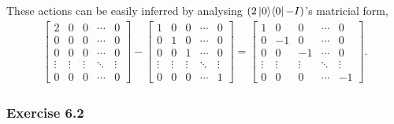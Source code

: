 These actions can be easily inferred by analysing $(2 \mathop{\mathinner{ |{0}\rangle \langle{0}|}} - I)$'s matricial form,
\begin{align}
    \left[ \begin{matrix}
        2 & 0 & 0 & \cdots & 0 \\
        0 & 0 & 0 & \cdots & 0 \\
        0 & 0 & 0 & \cdots & 0 \\
        \vdots & \vdots & \vdots & \ddots & \vdots \\
        0 & 0 & 0 & \cdots & 0
    \end{matrix} \right]
    -
    \left[ \begin{matrix}
        1 & 0 & 0 & \cdots & 0 \\
        0 & 1 & 0 & \cdots & 0 \\
        0 & 0 & 1 & \cdots & 0 \\
        \vdots & \vdots & \vdots & \ddots & \vdots \\
        0 & 0 & 0 & \cdots & 1
    \end{matrix} \right]
    =
    \left[ \begin{matrix}
        1 & 0 & 0 & \cdots & 0 \\
        0 & -1 & 0 & \cdots & 0 \\
        0 & 0 & -1 & \cdots & 0 \\
        \vdots & \vdots & \vdots & \ddots & \vdots \\
        0 & 0 & 0 & \cdots & -1
    \end{matrix} \right].
\end{align}

\subsubsection{Exercise 6.2}

